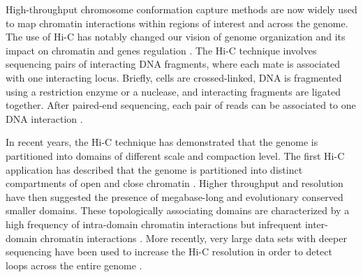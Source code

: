 High-throughput chromosome conformation capture methods are now widely used to
map chromatin interactions within regions of interest and across the genome.
The use of Hi-C has notably changed our vision of genome organization and its
impact on chromatin and genes regulation \citep{dewit:decade, barutcu:c-ing}.
The Hi-C technique involves
sequencing pairs of interacting DNA fragments, where each mate is associated
with one interacting locus. Briefly, cells are crossed-linked, DNA is
fragmented using a restriction enzyme or a nuclease, and interacting fragments
are ligated together. After paired-end sequencing, each pair of reads can be
associated to one DNA interaction \citep{lieberman-aiden:comprehensive}.

In recent years, the Hi-C technique has demonstrated that the genome is
partitioned into domains of different scale and compaction level. The first
Hi-C application has described that the genome is partitioned into distinct
compartments of open and close chromatin
\citep{lieberman-aiden:comprehensive}. Higher throughput and resolution have
then suggested the presence of megabase-long and evolutionary conserved
smaller domains. These topologically associating domains are characterized by
a high frequency of intra-domain chromatin interactions but infrequent
inter-domain chromatin interactions \citep{nora:spatial, dixon:topological}.
More recently, very large data sets with deeper sequencing have been used to
increase the Hi-C resolution in order to detect loops across the entire genome
\citep{rao:3d, jin:high-resolution}.


